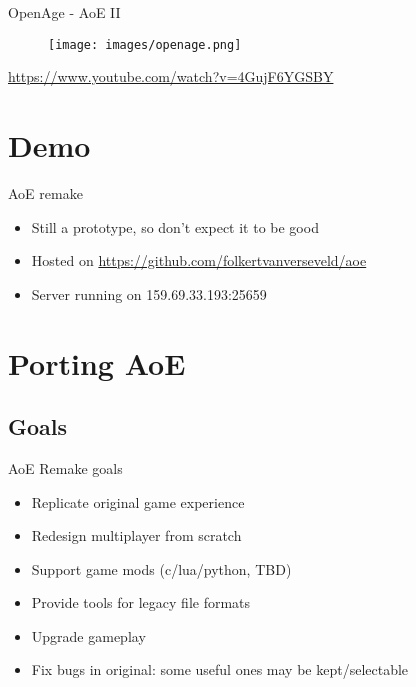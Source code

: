 \documentclass{beamer}
\begin{document}

\begin{frame}{OpenAge - AoE II}
	\begin{figure}
	\texttt{[image: images/openage.png]}
	\end{figure}
	\url{https://www.youtube.com/watch?v=4GujF6YGSBY}
\end{frame}


\section{Demo}

\begin{frame}{AoE remake}
	\begin{itemize}
		\item Still a prototype, so don't expect it to be good
		\item Hosted on \url{https://github.com/folkertvanverseveld/aoe}
		\item Server running on 159.69.33.193:25659
	\end{itemize}
\end{frame}


\section{Porting AoE}

\subsection{Goals}

\begin{frame}{AoE Remake goals}

	\begin{itemize}
		\item Replicate original game experience
		\item Redesign multiplayer from scratch
		\item Support game mods (c/lua/python, TBD)
		\item Provide tools for legacy file formats
		\item Upgrade gameplay
		\item Fix bugs in original: some useful ones may be kept/selectable
	\end{itemize}

\end{frame}
\end{document}
